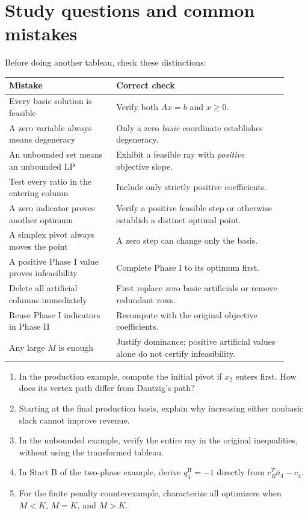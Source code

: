 \documentclass[11pt,a4paper]{article}
\begin{document}
\section{Study questions and common mistakes}\label{sec:review}
Before doing another tableau, check these distinctions:
\begin{center}
  \small
  \begin{tabular}{>{\raggedright\arraybackslash}p{0.35\linewidth}>{\raggedright\arraybackslash}p{0.57\linewidth}}\toprule
    Mistake & Correct check\\\midrule
    Every basic solution is feasible & Verify both $Ax=b$ and $x\geq0$.\\
    A zero variable always means degeneracy & Only a zero \emph{basic} coordinate establishes degeneracy.\\
    An unbounded set means an unbounded LP & Exhibit a feasible ray with \emph{positive} objective slope.\\
    Test every ratio in the entering column & Include only strictly positive coefficients.\\
    A zero indicator proves another optimum & Verify a positive feasible step or otherwise establish a distinct optimal point.\\
    A simplex pivot always moves the point & A zero step can change only the basis.\\
    A positive Phase I value proves infeasibility & Complete Phase I to its optimum first.\\
    Delete all artificial columns immediately & First replace zero basic artificials or remove redundant rows.\\
    Reuse Phase I indicators in Phase II & Recompute with the original objective coefficients.\\
    Any large $M$ is enough & Justify dominance; positive artificial values alone do not certify infeasibility.\\\bottomrule
  \end{tabular}
\end{center}
\begin{enumerate}[leftmargin=*,itemsep=0pt,topsep=4pt]
  \item In the production example, compute the initial pivot if $x_2$ enters
        first. How does its vertex path differ from Dantzig's path?
  \item Starting at the final production basis, explain why increasing either
        nonbasic slack cannot improve revenue.
  \item In the unbounded example, verify the entire ray in the original
        inequalities, without using the transformed tableau.
  \item In Start B of the two-phase example, derive $q_4^{\mathrm{II}}=-1$
        directly from $c_B^T\bar a_4-c_4$.
  \item For the finite penalty counterexample, characterize all optimizers
        when $M<K$, $M=K$, and $M>K$.
\end{enumerate}
\end{document}
